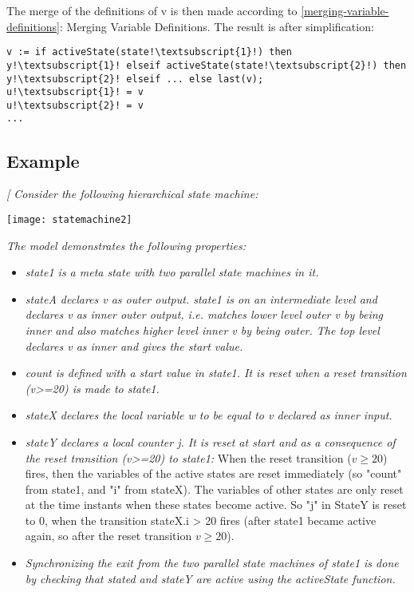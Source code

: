The merge of the definitions of v is then made according to \autoref{merging-variable-definitions}:
Merging Variable Definitions. The result is after
simplification:
\begin{lstlisting}[language=modelica,escapechar=!]
v := if activeState(state!\textsubscript{1}!) then y!\textsubscript{1}! elseif activeState(state!\textsubscript{2}!) then y!\textsubscript{2}! elseif ... else last(v);
u!\textsubscript{1}! = v
u!\textsubscript{2}! = v
...
\end{lstlisting}

\subsection{Example}

\emph{{[} Consider the following hierarchical state machine:}

\texttt{[image: statemachine2]}

\emph{The model demonstrates the following properties:}

\begin{itemize}
\item
  \emph{state1 is a meta state with two parallel state machines in it. }
\item
  \emph{stateA declares v as outer output. state1 is on an intermediate
  level and declares v as inner outer output, i.e. matches lower level
  outer v by being inner and also matches higher level inner v by being
  outer. The top level declares v as inner and gives the start value.}
\item
  \emph{count is defined with a start value in state1. It is reset when
  a reset transition (v\textgreater{}=20) is made to state1.}
\item
  \emph{stateX declares the local variable w to be equal to v declared
  as inner input.}
\item
  \emph{stateY declares a local counter j. It is reset at start and as a
  consequence of the reset transition (v\textgreater{}=20) to state1:}
  When the reset transition ($v\ge 20$) fires, then the variables of the
  active states are reset immediately (so "count" from state1, and "i"
  from stateX). The variables of other states are only reset at the time
  instants when these states become active. So "j" in StateY is reset to
  0, when the transition stateX.i \textgreater{} 20 fires (after state1
  became active again, so after the reset transition $v\ge 20$).
\item
  \emph{Synchronizing the exit from the two parallel state machines of
  state1 is done by checking that stated and stateY are active using the
  activeState function. }
\end{itemize}

